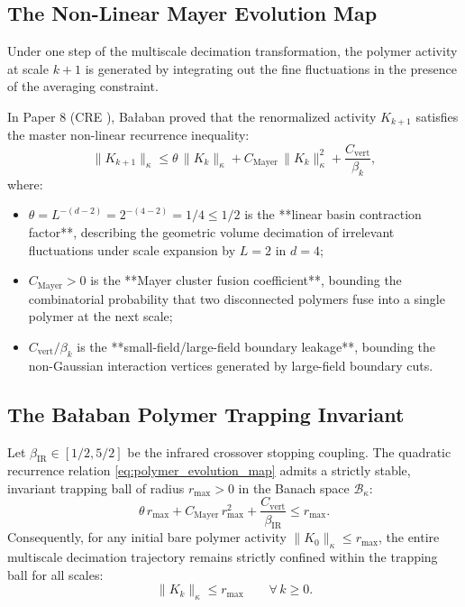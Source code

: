 \subsection{The Non-Linear Mayer Evolution Map}
\label{subsec:nonlinear_mayer_map}

Under one step of the multiscale decimation transformation, the polymer activity at scale $k+1$ is generated by integrating out the fine fluctuations in the presence of the averaging constraint. 

In Paper 8 (CRE \cite{Balaban1988b}), Ba\l aban proved that the renormalized activity $K_{k+1}$ satisfies the master non-linear recurrence inequality:
\begin{equation}
\label{eq:polymer_evolution_map}
\|K_{k+1}\|_\kappa \le \theta \, \|K_k\|_\kappa + C_{\mathrm{Mayer}} \, \|K_k\|_\kappa^2 + \frac{C_{\mathrm{vert}}}{\beta_k},
\end{equation}
where:
\begin{itemize}
    \item $\theta = L^{-(d-2)} = 2^{-(4-2)} = 1/4 \le 1/2$ is the **linear basin contraction factor**, describing the geometric volume decimation of irrelevant fluctuations under scale expansion by $L = 2$ in $d = 4$;
    \item $C_{\mathrm{Mayer}} > 0$ is the **Mayer cluster fusion coefficient**, bounding the combinatorial probability that two disconnected polymers fuse into a single polymer at the next scale;
    \item $C_{\mathrm{vert}} / \beta_k$ is the **small-field/large-field boundary leakage**, bounding the non-Gaussian interaction vertices generated by large-field boundary cuts.
\end{itemize}

\subsection{The Ba\l aban Polymer Trapping Invariant}
\label{subsec:trapping_invariant_proof}

\begin{theorem}
\label{thm:polymer_trapping_invariant}
Let $\beta_{\mathrm{IR}} \in [1/2, 5/2]$ be the infrared crossover stopping coupling. The quadratic recurrence relation \eqref{eq:polymer_evolution_map} admits a strictly stable, invariant trapping ball of radius $r_{\max} > 0$ in the Banach space $\mathcal{B}_\kappa$:
\begin{equation}
\label{eq:polymer_trapping_cert}
\theta \, r_{\max} + C_{\mathrm{Mayer}} \, r_{\max}^2 + \frac{C_{\mathrm{vert}}}{\beta_{\mathrm{IR}}} \le r_{\max}.
\end{equation}
Consequently, for any initial bare polymer activity $\|K_0\|_\kappa \le r_{\max}$, the entire multiscale decimation trajectory remains strictly confined within the trapping ball for all scales:
\begin{equation}
\label{eq:ch13_all_scale_trapping}
\|K_k\|_\kappa \le r_{\max} \qquad \forall \, k \ge 0.
\end{equation}
\end{theorem}

